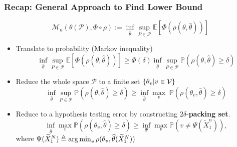 \documentclass[10pt,xcolor={usenames,dvipsnames,table},aspectratio=169]{beamer}
\begin{document}
\begin{frame}
\frametitle{Recap: General Approach to Find Lower Bound}   
    \[
    \mathcal{M}_n(\theta(\mathcal{P}), \Phi \circ \rho) := \inf_{\widehat{\theta}} \sup_{P \in \mathcal{P}} \mathbb{E} \left[  \Phi(\rho(\theta, \widehat{\theta})) \right]
    \] 
    \begin{itemize}
        \item Translate to probability (Markov inequality)
            \[
            \inf_{\widehat{\theta}} \sup_{P \in \mathcal{P}} \mathbb{E} \left[  \Phi(\rho(\theta, \widehat{\theta})) \right]
            \geq \Phi(\delta) \inf_{\widehat{\theta}} \sup_{P \in \mathcal{P}} \mathbb{P}(\rho(\theta, \widehat{\theta}) \geq \delta)
            \] 
        \item Reduce the whole space $ \mathcal{P}$ to a finite set $\left\{\theta_v| v \in \mathcal{V}\right\}$ 
            \[
            \inf_{\widehat{\theta}} \sup_{P \in \mathcal{P}}  \mathbb{P}(\rho(\theta, \widehat{\theta}) \geq \delta) 
            \geq \inf_{\widehat{\theta}} \max_{v}\; \mathbb{P}(\rho(\theta_v, \widehat{\theta}) \geq \delta)
            \] 
        \item Reduce to a hypothesis testing error by constructing $2\delta$-\textbf{packing set}. 
            \[
            \inf_{\widehat{\theta}} \max_{v} \mathbb{P}(\rho(\theta_v, \widehat{\theta}) \geq \delta) 
            \geq \inf_{\Psi} \max_{v} \mathbb{P}(v \neq \Psi(\widetilde{X}_1^{n})),
            \] 
            where $\Psi(\widetilde{X}_1^{N}) \triangleq \operatorname*{arg\,min}_{v} \rho(\theta_v, \widehat{\theta}(\widetilde{X}_1^{N}))$

    \end{itemize}
\end{frame}
\end{document}
